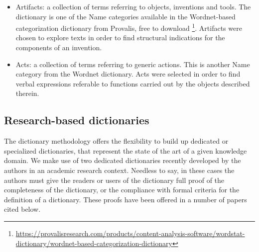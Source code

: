 \documentclass[]{book}
\let\rmarkdownfootnote\footnote%
\def\footnote{\protect\rmarkdownfootnote}
\theoremstyle{definition}
\theoremstyle{definition}
\theoremstyle{definition}
\theoremstyle{remark}
\begin{document}
\begin{itemize}
\item
  Artifacts: a collection of terms referring to objects, inventions and
  tools. The dictionary is one of the Name categories available in the
  Wordnet-based categorization dictionary from Provalis, free to
  download \footnote{\url{https://provalisresearch.com/products/content-analysis-software/wordstat-dictionary/wordnet-based-categorization-dictionary}}.
  Artifacts were chosen to explore texts in order to find structural
  indications for the components of an invention.
\item
  Acts: a collection of terms referring to generic actions. This is
  another Name category from the Wordnet dictionary. Acts were selected
  in order to find verbal expressions referable to functions carried out
  by the objects described therein.
\end{itemize}

\subsection{Research-based
dictionaries}\label{research-based-dictionaries}

The dictionary methodology offers the flexibility to build up dedicated
or specialized dictionaries, that represent the state of the art of a
given knowledge domain. We make use of two dedicated dictionaries
recently developed by the authors in an academic research context.
Needless to say, in these cases the authors must give the readers or
users of the dictionary full proof of the completeness of the
dictionary, or the compliance with formal criteria for the definition of
a dictionary. These proofs have been offered in a number of papers cited
below.
\end{document}
